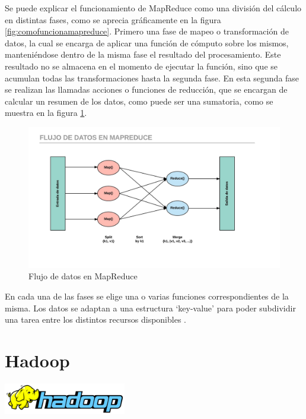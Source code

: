 Se puede explicar el funcionamiento de MapReduce como una división del cálculo en distintas fases, como se aprecia gráficamente en la figura \ref{fig:comofuncionamapreduce}.
Primero una fase de mapeo o transformación de datos, la cual se encarga de aplicar una función de cómputo sobre los mismos, manteniéndose dentro de la misma fase el resultado del procesamiento. Este resultado no se almacena en el momento de ejecutar la función, sino que se acumulan todas las transformaciones hasta la segunda fase. En esta segunda fase se realizan las llamadas acciones o funciones de reducción, que se encargan de calcular un resumen de los datos, como puede ser una sumatoria, como se muestra en la figura \ref{fig:flujodedatosenmapreduce}.

\begin{figure}
	\centering
	\includegraphics[width=1\linewidth]{imagenes/Flujo_de_datos_en_MapReduce}
	\caption{Flujo de datos en MapReduce}
	\label{fig:flujodedatosenmapreduce}
\end{figure}

En cada una de las fases se elige una o varias funciones correspondientes de la misma. Los datos se adaptan a una estructura ‘key-value’ para poder subdividir una tarea entre los distintos recursos disponibles \cite{MRHadoopLibro}. 

\section{Hadoop}
\begin{minipage}{\textwidth}
	\centering
	\includegraphics[width=0.4\textwidth]{imagenes/hadoop_logo.png}\\[0.1cm]
\end{minipage}

